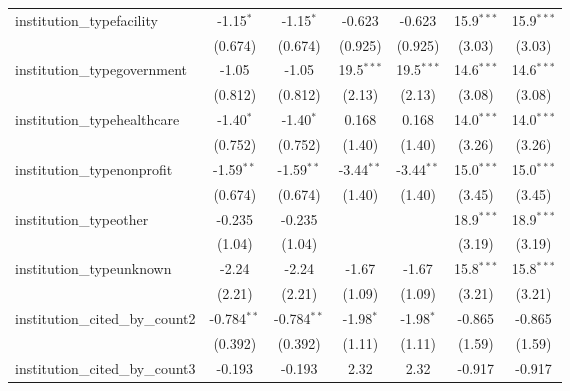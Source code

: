 \begin{tabular}{lcccccc}
   institution\_typefacility             & -1.15$^{*}$   & -1.15$^{*}$   & -0.623        & -0.623        & 15.9$^{***}$  & 15.9$^{***}$\\   
                                         & (0.674)       & (0.674)       & (0.925)       & (0.925)       & (3.03)        & (3.03)\\   
   institution\_typegovernment           & -1.05         & -1.05         & 19.5$^{***}$  & 19.5$^{***}$  & 14.6$^{***}$  & 14.6$^{***}$\\   
                                         & (0.812)       & (0.812)       & (2.13)        & (2.13)        & (3.08)        & (3.08)\\   
   institution\_typehealthcare           & -1.40$^{*}$   & -1.40$^{*}$   & 0.168         & 0.168         & 14.0$^{***}$  & 14.0$^{***}$\\   
                                         & (0.752)       & (0.752)       & (1.40)        & (1.40)        & (3.26)        & (3.26)\\   
   institution\_typenonprofit            & -1.59$^{**}$  & -1.59$^{**}$  & -3.44$^{**}$  & -3.44$^{**}$  & 15.0$^{***}$  & 15.0$^{***}$\\   
                                         & (0.674)       & (0.674)       & (1.40)        & (1.40)        & (3.45)        & (3.45)\\   
   institution\_typeother                & -0.235        & -0.235        &               &               & 18.9$^{***}$  & 18.9$^{***}$\\   
                                         & (1.04)        & (1.04)        &               &               & (3.19)        & (3.19)\\   
   institution\_typeunknown              & -2.24         & -2.24         & -1.67         & -1.67         & 15.8$^{***}$  & 15.8$^{***}$\\   
                                         & (2.21)        & (2.21)        & (1.09)        & (1.09)        & (3.21)        & (3.21)\\   
   institution\_cited\_by\_count2        & -0.784$^{**}$ & -0.784$^{**}$ & -1.98$^{*}$   & -1.98$^{*}$   & -0.865        & -0.865\\   
                                         & (0.392)       & (0.392)       & (1.11)        & (1.11)        & (1.59)        & (1.59)\\   
   institution\_cited\_by\_count3        & -0.193        & -0.193        & 2.32          & 2.32          & -0.917        & -0.917\\   

\end{tabular}
